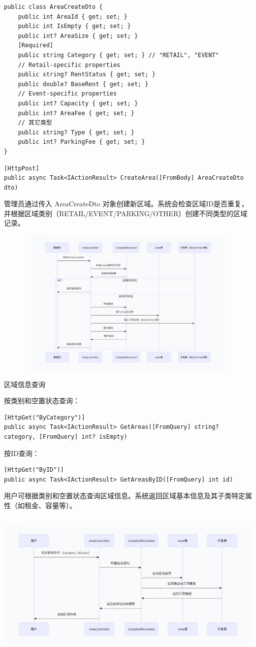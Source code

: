 \documentclass[]{article}
\begin{document}
\begin{verbatim}
public class AreaCreateDto {
    public int AreaId { get; set; }
    public int IsEmpty { get; set; }
    public int? AreaSize { get; set; }
    [Required]
    public string Category { get; set; } // "RETAIL", "EVENT"
    // Retail-specific properties
    public string? RentStatus { get; set; }
    public double? BaseRent { get; set; }
    // Event-specific properties
    public int? Capacity { get; set; }
    public int? AreaFee { get; set; }
    // 其它类型
    public string? Type { get; set; }
    public int? ParkingFee { get; set; }
}
\end{verbatim}

\begin{verbatim}
[HttpPost]
public async Task<IActionResult> CreateArea([FromBody] AreaCreateDto dto)
\end{verbatim}
管理员通过传入 AreaCreateDto 对象创建新区域。系统会检查区域ID是否重复，并根据区域类别（RETAIL/EVENT/PARKING/OTHER）创建不同类型的区域记录。

\includegraphics[width=5.64167in,height=2.86458in]{media/media/image_2-3-5.png}

区域信息查询

按类别和空置状态查询：
\begin{verbatim}
[HttpGet("ByCategory")]
public async Task<IActionResult> GetAreas([FromQuery] string? category, [FromQuery] int? isEmpty)
\end{verbatim}
按ID查询：
\begin{verbatim}
[HttpGet("ByID")]
public async Task<IActionResult> GetAreasByID([FromQuery] int id)
\end{verbatim}
用户可根据类别和空置状态查询区域信息。系统返回区域基本信息及其子类特定属性（如租金、容量等）。

\includegraphics[width=5.64167in,height=2.86458in]{media/media/image_2-3-6.png}
\end{document}
